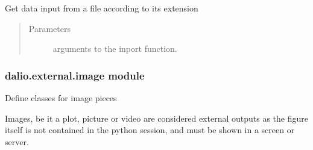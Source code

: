 \documentclass[letterpaper,10pt,english]{sphinxmanual}
\begin{document}
\begin{fulllineitems}
\begin{fulllineitems}
\label{\detokenize{dalio.external:dalio.external.file.PandasInFile.request}}
Get data input from a file according to its extension
\begin{quote}\begin{description}
\item[{Parameters}] \leavevmode
{} \textendash{} arguments to the inport function.

\end{description}\end{quote}

\end{fulllineitems}


\end{fulllineitems}



\subsubsection{dalio.external.image module}
\label{\detokenize{dalio.external:module-dalio.external.image}}\label{\detokenize{dalio.external:dalio-external-image-module}}
Define classes for image pieces

Images, be it a plot, picture or video are considered external outputs as the
figure itself is not contained in the python session, and must be shown in a
screen or server.
\end{document}

